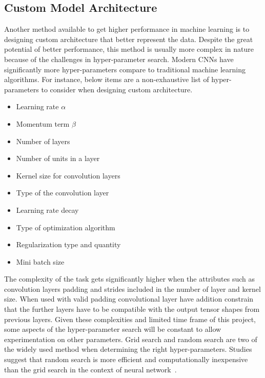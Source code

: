 \subsection{Custom Model Architecture}
Another method available to get higher performance in machine learning is to designing custom architecture that better represent the data.
Despite the great potential of better performance, this method is usually more complex in nature because of the challenges in hyper-parameter search.
Modern CNNs have significantly more hyper-parameters compare to traditional machine learning algorithms. 
For instance, below items are a non-exhaustive list of hyper-parameters to consider when designing custom architecture.

\begin{itemize}
    \item Learning rate $\alpha$
    \item Momentum term $\beta$
    \item Number of layers
    \item Number of units in a layer
    \item Kernel size for convolution layers
    \item Type of the convolution layer
    \item Learning rate decay
    \item Type of optimization algorithm
    \item Regularization type and quantity
    \item Mini batch size
\end{itemize}

The complexity of the task gets significantly higher when the attributes such as convolution layers padding and strides included in the number of layer and kernel size.
When used with valid padding convolutional layer have addition constrain that the further layers have to be compatible with the output tensor shapes from previous layers.
Given these complexities and limited time frame of this project, some aspects of the hyper-parameter search will be constant to allow experimentation on other parameters.
Grid search and random search are two of the widely used method when determining the right hyper-parameters.
Studies suggest that random search is more efficient and computationally inexpensive than the grid search in the context of neural network~\cite{randomsearch}.

